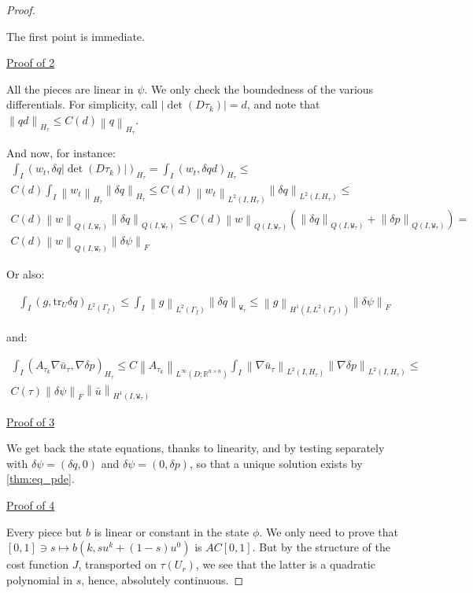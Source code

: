 \documentclass[english,a4paper,9pt,oneside]{scrbook}	%
\theoremstyle{break}
\newenvironment{mproof}[1][\proofname]{%
  \begin{proof}[#1]$ $\par\nobreak\ignorespaces
}{%
  \end{proof}
}
\renewcommand*{\proofname}{Proof}
\theoremstyle{remark}
\newcommand{\mR}{\mathbb{R}}
\newcommand{\norm}[1]{\left\lVert#1\right\rVert}
\newcommand{\tr}{\text{tr}}
\newcommand{\tw}[1]{\texttt{#1}}
\begin{document}
\begin{mproof}

The first point is immediate.

\underline{Proof of 2}

All the pieces are linear in $\psi$. We only check the boundedness of the various differentials. For simplicity, call $|\det(D\tau_k)|=d$, and note that   $\norm{qd}_{H_\tau}\leq C(d)\norm{q}_{H_\tau}$.

And now, for instance:
\begin{align*}
\int_I ( w_t , \delta q |\det(D\tau_k)|)_{H_\tau} = \int_I ( w_t , \delta q d )_{H_\tau}\leq\\ C(d) \int_I \norm{w_t}_{H_\tau}\norm{\delta q}_{H_\tau}\leq C(d) \norm{w_t}_{L^2(I,H_\tau)}\norm{\delta q}_{L^2(I,H_\tau)}\leq\\C(d) \norm{w}_{Q(I,\tw{W}_\tau)}\norm{\delta q}_{Q(I,\tw{W}_\tau)}\leq
C(d) \norm{w}_{Q(I,\tw{W}_\tau)}(\norm{\delta q}_{Q(I,\tw{W}_\tau)}+\norm{\delta p}_{Q(I,\tw{W}_\tau)}) =\\ C(d) \norm{w}_{Q(I,\tw{W}_\tau)}\norm{\delta\psi}_F
\end{align*}

Or also:

\begin{align*}
\int_I(g,\tr_{U} \delta q)_{L^2(\Gamma_f)}\leq \int_I \norm{g}_{L^2(\Gamma_f)}\norm{\delta q}_{\tw{W}_\tau}\leq \norm{g}_{H^1(I,L^2(\Gamma_f))}\norm{\delta\psi}_F
\end{align*}

and:

\begin{align*}
\int_I (A_{\tau_k} \nabla \bar{u}_\tau, \nabla\delta p)_{H_\tau}\leq C\norm{A_{\tau_k}}_{L^\infty(D;\mR^{n\times n})}\int_I \norm{\nabla \bar{u}_\tau}_{L^2(I,H_\tau)}\norm{\nabla\delta p}_{L^2(I,H_\tau)}\leq\\ C(\tau) \norm{\delta\psi}_F \norm{\bar{u}}_{H^1(I,\tw{W}_\tau)}
\end{align*}

\underline{Proof of 3}

We get back the state equations, thanks to linearity, and by testing separately with $\delta \psi =(\delta q, 0)$ and $\delta \psi = (0,\delta p)$, so that a unique solution exists by \cref{thm:eq_pde}.

\underline{Proof of 4}

Every piece but $b$ is linear or constant in the state $\phi$. We only need to prove that $[0,1]\ni s \mapsto b(k, su^k + (1-s)u^0)$ is $AC[0,1]$. But by the structure of the cost function $J$, transported on $\tau(U_r)$, we see that the latter is a quadratic polynomial in $s$, hence, absolutely continuous.


\end{mproof}
\end{document}

